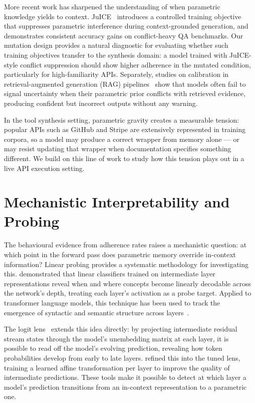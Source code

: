 More recent work has sharpened the understanding of when parametric knowledge yields to context. JuICE~\citep{juice2025} introduces a controlled training objective that suppresses parametric interference during context-grounded generation, and demonstrates consistent accuracy gains on conflict-heavy QA benchmarks. Our mutation design provides a natural diagnostic for evaluating whether such training objectives transfer to the synthesis domain: a model trained with JuICE-style conflict suppression should show higher adherence in the mutated condition, particularly for high-familiarity APIs. Separately, studies on calibration in retrieval-augmented generation (RAG) pipelines~\citep{ragknowswrong2025} show that models often
fail to signal uncertainty when their parametric prior conflicts with retrieved evidence, producing confident but incorrect outputs without any warning.

In the tool synthesis setting, parametric gravity creates a measurable tension: popular APIs such as GitHub and Stripe are extensively represented in training corpora, so a model may produce a correct wrapper from memory alone --- or may resist updating that wrapper when documentation specifies something different. We build on this line of work to study how this tension plays out in a live API execution setting.

\section{Mechanistic Interpretability and Probing}
\label{sec:related_work:mechanistic}

The behavioural evidence from adherence rates raises a mechanistic question: at which point in the forward pass does parametric memory override in-context information? Linear probing provides a systematic methodology for investigating this. \citet{alain2017understanding} demonstrated
that linear classifiers trained on intermediate layer representations reveal when and where concepts become linearly decodable across the network's depth, treating each layer's activation as a probe target. Applied to transformer
language models, this technique has been used to track the emergence of syntactic and semantic structure across layers~\citep{tenney2019bert}.

The logit lens~\citep{nostalgebraist2020logitlens} extends this idea directly: by projecting intermediate residual stream states through the model's unembedding matrix at each layer, it is possible to read off the model's evolving prediction, revealing how token probabilities develop from early to late layers. \citet{belrose2023tunedlens} refined this into the tuned lens, training a learned affine transformation per layer to improve the quality of intermediate predictions. These tools make it possible to detect at which layer a model's prediction transitions from an in-context representation to a parametric one.

